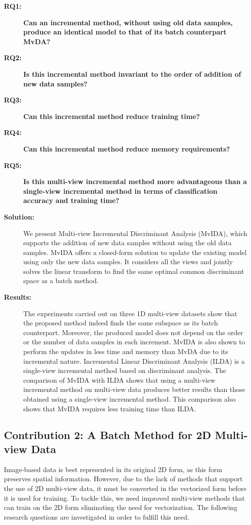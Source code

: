 \begin{description}
\item[\textbf{RQ1: }] \textbf{Can an incremental method, without using old data samples, produce an identical model to that of its batch counterpart MvDA?}

\item[\textbf{RQ2: }] \textbf{Is this incremental method invariant to the order of addition of new data samples?}

\item[\textbf{RQ3: }] \textbf{Can this incremental method reduce training time?}

\item[\textbf{RQ4: }] \textbf{Can this incremental method reduce memory requirements?}

\item[\textbf{RQ5: }] \textbf{Is this multi-view incremental method more advantageous than a single-view incremental method in terms of classification accuracy and training time?}

\item[\textbf{Solution: }] We present Multi-view Incremental Discriminant Analysis (MvIDA), which supports the addition of new data samples without using the old data samples. MvIDA offers a closed-form solution to update the existing model using only the new data samples. It considers all the views and jointly solves the linear transform to find the same optimal common discriminant space as a batch method.

\item[\textbf{Results:}] The experiments carried out on three 1D multi-view datasets show that the proposed method indeed finds the same subspace as its batch counterpart. Moreover, the produced model does not depend on the order or the number of data samples in each increment. MvIDA is also shown to perform the updates in less time and memory than MvDA due to its incremental nature. Incremental Linear Discriminant Analysis (ILDA) is a single-view incremental method based on discriminant analysis. The comparison of MvIDA with ILDA shows that using a multi-view incremental method on multi-view data produces better results than those obtained using a single-view incremental method. This comparison also shows that MvIDA requires less training time than ILDA.
\end{description}



\subsection{Contribution 2: A Batch Method for 2D Multi-view Data}
Image-based data is best represented in its original 2D form, as this form preserves spatial information. However, due to the lack of methods that support the use of 2D multi-view data, it must be converted in the vectorized form before it is used for training. To tackle this, we need improved multi-view methods that can train on the 2D form eliminating the need for vectorization. The following research questions are investigated in order to fulfill this need.



